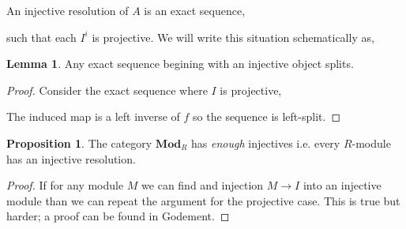 \documentclass[12pt]{article}
\newcommand{\id}{\mathrm{id}}
\newcommand{\Mod}[1]{\mathbf{Mod}_{#1}}
\theoremstyle{remark}
\theoremstyle{definition}
\newtheorem{lemma}[theorem]{Lemma}
\newtheorem{proposition}[theorem]{Proposition}
\newenvironment{definition}[1][Definition:]{\begin{trivlist}
\item[\hskip \labelsep {\bfseries #1}]}{\end{trivlist}}
\begin{document}
\begin{definition}
An injective resolution of $A$ is an exact sequence,
\begin{center}
\end{center}
such that each $I^i$ is projective. We will write this situation schematically as,
\begin{center}
\end{center}
\end{definition}

\begin{lemma}
Any exact sequence begining with an injective object splits.
\end{lemma}

\begin{proof}
Consider the exact sequence where $I$ is projective,
\begin{center}
\end{center}
The induced map is a left inverse of $f$ so the sequence is left-split.
\end{proof}

\begin{proposition}
The category $\Mod{R}$ has \textit{enough} injectives i.e. every $R$-module has an injective resolution.
\end{proposition}

\begin{proof}
If for any module $M$ we can find and injection $M \to I$ into an injective module than we can repeat the argument for the projective case. This is true but harder; a proof can be found in Godement. 
\end{proof}
\end{document}
